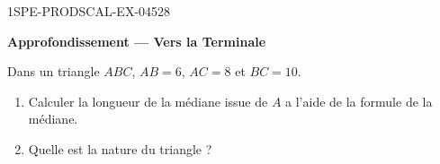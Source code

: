 \begin{exercice}{1SPE-PRODSCAL-EX-045}{2}{8}
\begin{center}\textbf{Approfondissement — Vers la Terminale}\end{center}
Dans un triangle $ABC$, $AB = 6$, $AC = 8$ et $BC = 10$.
\begin{enumerate}
  \item Calculer la longueur de la médiane issue de $A$ a l'aide de la formule de la médiane.
  \item Quelle est la nature du triangle ?
\end{enumerate}
\end{exercice}
